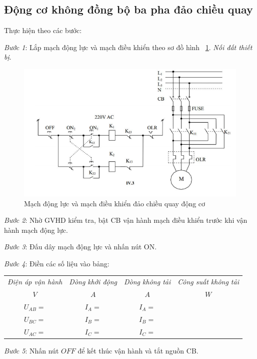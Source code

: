 \documentclass[13pt,a4paper]{extarticle}
\begin{document}
\subsection{Động cơ không đồng bộ ba pha đảo chiều quay}
Thực hiện theo các bước:
\begin{list}{--}{}
\item \textit{Bước 1}: Lắp mạch động lực và mạch điều khiển theo sơ đồ hình ~\ref{Fig:2}. \textit{Nối đất thiết bị}.
\begin{figure}[!h]
\begin{center}
\includegraphics[scale=.6]{2}
\end{center}
\caption{Mạch động lực và mạch điều khiển đảo chiều quay động cơ}\label{Fig:2}
\end{figure}
\item \textit{Bước 2}: Nhờ GVHD kiểm tra, bật CB vận hành mạch điều khiển trước khi vận hành mạch động lực. 
\item \textit{Bước 3}: Đấu dây mạch động lực và nhấn nút ON.
\item \textit{Bước 4}: Điền các số liệu vào bảng:
\begin{center}
\begin{tabular}{|c|c|c|c|}\hline
\textit{Điện áp vận hành} & \textit{Dòng khởi động} & \textit{Dòng không tải} & \textit{Công suất không tải}\\ 
$V$ & $A$ & $A$ & $W$ \\ \hline
$U_{AB}= $&$I_A = $ & $I_A = $ & \\ \hline
$U_{BC}= $&$I_B = $ & $I_B = $ & \\ \hline
$U_{AC}= $&$I_C = $ & $I_C = $ & \\ \hline
\end{tabular}
\end{center}
\item \textit{Bước 5}: Nhấn nút $OFF$ để kết thúc vận hành và tắt nguồn CB.
\end{list}
\end{document}
